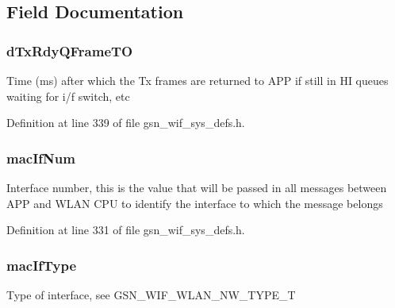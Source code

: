 \subsection{Field Documentation}
\hypertarget{a00353_ae8f42a0ee7b57763cd16c0ee167535d6}{
\subsubsection[{dTxRdyQFrameTO}]{ {\bf dTxRdyQFrameTO}}}
\label{a00353_ae8f42a0ee7b57763cd16c0ee167535d6}
Time (ms) after which the Tx frames are returned to APP if still in HI queues waiting for i/f switch, etc 

Definition at line 339 of file gsn\_\-wif\_\-sys\_\-defs.h.

\hypertarget{a00353_ae57ae92e651751e7978e237c55133b4c}{
\subsubsection[{macIfNum}]{ {\bf macIfNum}}}
\label{a00353_ae57ae92e651751e7978e237c55133b4c}
Interface number, this is the value that will be passed in all messages between APP and WLAN CPU to identify the interface to which the message belongs 

Definition at line 331 of file gsn\_\-wif\_\-sys\_\-defs.h.

\hypertarget{a00353_ae22f1eeffa8ecf759f18f577db286c8d}{
\subsubsection[{macIfType}]{ {\bf macIfType}}}
\label{a00353_ae22f1eeffa8ecf759f18f577db286c8d}
Type of interface, see GSN\_\-WIF\_\-WLAN\_\-NW\_\-TYPE\_\-T 

